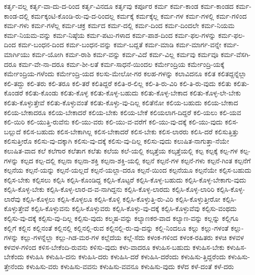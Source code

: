 {ಕರ್ತೃ-ವಲ್ಲ
ಕರ್ತೃ-ವಾ-ದು-ದ-ರಿಂದ
ಕರ್ತೃ-ವಿನದೂ
ಕರ್ತೃವು
ಕರ್ಪೂರ
ಕರ್ಮ
ಕರ್ಮ-ಕಾಂಡ
ಕರ್ಮ-ಕಾಂಡದ
ಕರ್ಮ-ಕಾಂಡ-ದಲ್ಲಿ
ಕರ್ಮಕ್ಕಂಟಿ-ಕೊಂಡಿ-ರು-ವು-ದ-ರಿಂದಲ್ಲ
ಕರ್ಮಕ್ಕೆ
ಕರ್ಮಕ್ಕೆಲ್ಲ
ಕರ್ಮ-ಗಳ
ಕರ್ಮ-ಗಳಲ್ಲಿ
ಕರ್ಮ-ಗಳಿಂದ
ಕರ್ಮ-ಗಳು
ಕರ್ಮ-ಗಳೆಲ್ಲ
ಕರ್ಮ-ಚಕ್ರ
ಕರ್ಮದ
ಕರ್ಮ-ದಲ್ಲಿ
ಕರ್ಮ-ದಿಂದ
ಕರ್ಮ-ದಿಂದಲೇ
ಕರ್ಮ-ನಿಯಮ
ಕರ್ಮ-ನಿಯಮ-ವನ್ನು
ಕರ್ಮ-ನಿಷ್ಠೆಯ
ಕರ್ಮ-ಪಟು-ಗಳಾದ
ಕರ್ಮ-ಪಾಶ-ದಿಂದ
ಕರ್ಮ-ಫಲ-ಗಳನ್ನು
ಕರ್ಮ-ಫಲ-ದಿಂದ
ಕರ್ಮ-ಬಂಧನ-ದಿಂದ
ಕರ್ಮ-ಬಂಧನ-ವನ್ನು
ಕರ್ಮ-ಬದ್ದತೆ
ಕರ್ಮ-ಮಾಡಿ
ಕರ್ಮ-ಮಾರ್ಗ-ವನ್ನೇ
ಕರ್ಮ-ಮಾರ್ಗಿಯು
ಕರ್ಮ-ಯೋಗಿ
ಕರ್ಮ-ರಾಶಿ
ಕರ್ಮ-ವನ್ನು
ಕರ್ಮ-ವಿದೆ
ಕರ್ಮ-ವಿಲ್ಲ
ಕರ್ಮವು
ಕರ್ಮವೂ
ಕರ್ಮ-ವೆಸಗಿ-ದರೂ
ಕರ್ಮ-ವೇ-ನಾ-ದರೂ
ಕರ್ಮ-ಶೀ-ಲತೆ
ಕರ್ಮ-ಸಾಧನೆ-ಯಿಂದಲ
ಕರ್ಮೇಂದ್ರಿಯ
ಕರ್ಮೇಂದ್ರಿ-ಯಕ್ಕೆ
ಕರ್ಮೇಂದ್ರಿಯ-ಗಳೆಂದು
ಕರ್ಮೇಂದ್ರಿ-ಯದ
ಕಲಸು-ಮೇಲೋ-ಗರ
ಕಲಹ-ಗಳನ್ನು
ಕಲಾವಿದನೂ
ಕಲಿತ
ಕಲಿತದ್ದನ್ನೆಲ್ಲಾ
ಕಲಿ-ತದ್ದು
ಕಲಿ-ತರು
ಕಲಿ-ತರೂ
ಕಲಿ-ತರೆ
ಕಲಿತಿದ್ದರೆ
ಕಲಿತಿ-ರ-ಲಿಲ್ಲ
ಕಲಿ-ತಿ-ರು-ವಿರಿ
ಕಲಿ-ತಿ-ರು-ವುದು
ಕಲಿತು
ಕಲಿತು-ಕೊಂಡರೆ
ಕಲಿತು-ಕೊಂಡು
ಕಲಿತು-ಕೊಳ್ಳ
ಕಲಿತು-ಕೊಳ್ಳ-ಬಹುದು
ಕಲಿತು-ಕೊಳ್ಳ-ಬೇಕಾದ
ಕಲಿತು-ಕೊಳ್ಳ-ಲೇ-ಬೇಕು
ಕಲಿತು-ಕೊಳ್ಳುತ್ತೇವೆ
ಕಲಿತು-ಕೊಳ್ಳುವಂತೆ
ಕಲಿತು-ಕೊಳ್ಳು-ವು-ದಿಲ್ಲ
ಕಲಿತೆನೋ
ಕಲಿಯ-ಬಹುದು
ಕಲಿಯ-ಬೇಕಾದ
ಕಲಿಯ-ಬೇಕಾದರೂ
ಕಲಿಯ-ಬೇಕಾದರೆ
ಕಲಿಯ-ಬೇಕು
ಕಲಿಯ-ಬೇಕೆ
ಕಲಿಯಲಾಗ-ದಿದ್ದರೆ
ಕಲಿ-ಯಲು
ಕಲಿ-ಯವ
ಕಲಿ-ಯಿರಿ
ಕಲಿ-ಯುತ್ತಿ-ರುವೆನು
ಕಲಿ-ಯು-ವರು
ಕಲಿ-ಯು-ವ-ವರೆಗೆ
ಕಲಿ-ಯು-ವು-ದಕ್ಕೆ
ಕಲಿ-ಯು-ವುದು
ಕಲಿಸ-ಬಲ್ಲುದೆ
ಕಲಿಸ-ಬಹುದು
ಕಲಿಸ-ಬೇಕಾಗಿಲ್ಲ
ಕಲಿಸ-ಬೇಕಾದರೆ
ಕಲಿಸ-ಬೇಕು
ಕಲಿಸ-ಲಾರರು
ಕಲಿಸಿ-ದರೆ
ಕಲಿಸುತ್ತಿತ್ತು
ಕಲಿಸುತ್ತೀರೊ
ಕಲಿಸು-ವು-ದಕ್ಕಾಗಿ
ಕಲಿಸು-ವು-ದಕ್ಕೆ
ಕಲಿಸು-ವು-ದಿಲ್ಲ
ಕಲಿಸು-ವುದು
ಕಲುಷಿತ-ನಾಗುತ್ತಾ-ನೆಯೇ
ಕಲುಷಿತ-ವಾದ
ಕಲೆ
ಕಲೆಗಾರ
ಕಲೆತಾಗ
ಕಲೆತು
ಕಲೆಯ
ಕಲೆ-ಯಲ್ಲಿ
ಕಲ್ಕತ್ತೆಯ
ಕಲ್ಕತ್ತೆಯಲ್ಲಿ
ಕಲ್ಪ
ಕಲ್ಪಕ್ಕೆ
ಕಲ್ಪ-ಗಳ
ಕಲ್ಪ-ಗಳನ್ನು
ಕಲ್ಪದ
ಕಲ್ಪ-ದಲ್ಲಿ
ಕಲ್ಪನಾ
ಕಲ್ಪನಾ-ಶಕ್ತಿ
ಕಲ್ಪನಾ-ಶಕ್ತಿ-ಯಲ್ಲಿ
ಕಲ್ಪನೆ
ಕಲ್ಪನೆ-ಗಳ
ಕಲ್ಪನೆ-ಗಳು
ಕಲ್ಪನೆ-ಗಿಂತ
ಕಲ್ಪನೆಗೆ
ಕಲ್ಪನೆಯ
ಕಲ್ಪನೆ-ಯನ್ನು
ಕಲ್ಪನೆ-ಯಲ್ಲದೆ
ಕಲ್ಪನೆ-ಯಲ್ಲಾ-ದರೂ
ಕಲ್ಪನೆ-ಯಿಂದ
ಕಲ್ಪನೆಯೂ
ಕಲ್ಪನೆಯೇ
ಕಲ್ಪಿಸ-ಬಹುದು
ಕಲ್ಪಿಸ-ಬೇಕು
ಕಲ್ಪಿಸಲು
ಕಲ್ಪಿಸಿ
ಕಲ್ಪಿಸಿ-ಕೊಂಡಿದ್ದ
ಕಲ್ಪಿಸಿ-ಕೊಟ್ಟರೆ
ಕಲ್ಪಿಸಿ-ಕೊಳ್ಳ-ಬಹುದು
ಕಲ್ಪಿಸಿ-ಕೊಳ್ಳ-ಬೇಕಾಗು-ವುದು
ಕಲ್ಪಿಸಿ-ಕೊಳ್ಳ-ಬೇಕು
ಕಲ್ಪಿಸಿ-ಕೊಳ್ಳ-ಲಾರ-ದ-ವ-ನಾಗಿದ್ದನು
ಕಲ್ಪಿಸಿ-ಕೊಳ್ಳ-ಲಾರದು
ಕಲ್ಪಿಸಿ-ಕೊಳ್ಳ-ಲಾರಿರಿ
ಕಲ್ಪಿಸಿ-ಕೊಳ್ಳ-ಲಾರೆವು
ಕಲ್ಪಿಸಿ-ಕೊಳ್ಳಲು
ಕಲ್ಪಿಸಿ-ಕೊಳ್ಳಲೂ
ಕಲ್ಪಿಸಿ-ಕೊಳ್ಳಿ
ಕಲ್ಪಿಸಿ-ಕೊಳ್ಳುತ್ತಿ-ರು-ವಿರಿ
ಕಲ್ಪಿಸಿ-ಕೊಳ್ಳುತ್ತೀರೋ
ಕಲ್ಪಿಸಿ-ಕೊಳ್ಳುತ್ತೇವೆ
ಕಲ್ಪಿಸಿ-ಕೊಳ್ಳುವನು
ಕಲ್ಪಿಸಿ-ಕೊಳ್ಳುವರು
ಕಲ್ಪಿಸಿ-ಕೊಳ್ಳು-ವು-ದಕ್ಕೆ
ಕಲ್ಪಿಸಿ-ಕೊಳ್ಳುವೆವು
ಕಲ್ಪಿಸು-ವಂಥದು
ಕಲ್ಪಿಸು-ವು-ದಕ್ಕೆ
ಕಲ್ಪಿಸು-ವು-ದಿಲ್ಲ
ಕಲ್ಪಿಸು-ವುದು
ಕಲ್ಮಷ-ವನ್ನು
ಕಲ್ಯಾಣಕರ-ವಾದ
ಕಲ್ಯಾಣ-ವನ್ನು
ಕಲ್ಲನ್ನು
ಕಲ್ಲಿಗೂ
ಕಲ್ಲಿಗೆ
ಕಲ್ಲಿನ
ಕಲ್ಲಿನಂತೆ
ಕಲ್ಲಿನಲ್ಲಿ
ಕಲ್ಲಿನಲ್ಲಿ-ರುವ
ಕಲ್ಲಿನಲ್ಲಿ-ರು-ವು-ದನ್ನು
ಕಲ್ಲಿ-ನಿಂದಲೂ
ಕಲ್ಲು
ಕಲ್ಲು-ಗಳಂತೆ
ಕಲ್ಲು-ಗಳನ್ನು
ಕಲ್ಲು-ಗಳನ್ನೆಲ್ಲಾ
ಕಲ್ಲು-ಗಿಡ-ಮರ-ಗಳ
ಕಲ್ಲೆದೆಯ
ಕಲ್ಲೆ-ಸೆದು
ಕಳಂಕ-ಗಳಿಂದ
ಕಳಂಕ-ರಹಿತರು
ಕಳಚಿ
ಕಳವಳ
ಕಳವಳ-ಗಳಿಂದ
ಕಳಿಸ-ಬೇಕೆಂದಿ-ರುವನು
ಕಳಿಸು-ವುದು
ಕಳು-ವಾದರೂ
ಕಳುಹಿಸ-ಬಹುದು
ಕಳುಹಿಸ-ಬೇಕು
ಕಳುಹಿಸ-ಬೇಕೆಂದು
ಕಳುಹಿಸಿ
ಕಳುಹಿಸಿ-ದನು
ಕಳುಹಿಸಿ-ದರು
ಕಳುಹಿಸಿ-ದರೆ
ಕಳುಹಿಸಿ-ದರೆಂದು
ಕಳುಹಿಸು-ತ್ತಿದ್ದರೆಂದು
ಕಳುಹಿಸು-ತ್ತೇನೆಂದು
ಕಳುಹಿಸು-ವರು
ಕಳುಹಿಸು-ವವನು
ಕಳುಹಿಸು-ವವನೂ
ಕಳುಹಿಸು-ವುದು
ಕಳೆದ
ಕಳೆ-ದಂತೆ
ಕಳೆ-ದರು
}
